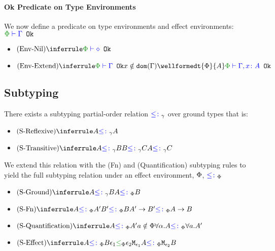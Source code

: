 \documentclass{report}
\begin{document}
\paragraph{Ok Predicate on Type Environments}
We now define a predicate on type environments and effect environments: $\oke{\P}{\G}$

\begin{itemize}
    \item $\ntreerulez{\envnil}{\oke{\P}{\nil}}$
    \item $\ntreeruleIII{\envextend}{\oke{\P}{\G}}{ x\notin\dom{\G}}{ \wellformedt{\P}{A}}{\oke{\P}{\gax}}$
\end{itemize}



\subsection{Subtyping}
    There exists a subtyping partial-order relation $\subtype_{\ground}$ over ground types that is:
    \begin{itemize}
        \item $\ntreerulez{\sreflexive}{A \subtype_{\ground} A}$
        \item $\ntreeruleII{\stransitive}{A \subtype_{\ground} B }{ B \subtype_{\ground} C}{A \subtype_{\ground} C}$
    \end{itemize}

    We extend this relation with the (Fn) and (Quantification) subtyping rules to yield the full subtyping relation under an effect environment, $\P$, $\subtypep$

    \begin{itemize}
        \item $\ntreeruleI{\sground}{A \subtype_{\ground} B}{A \subtypep B}$
        \item $\ntreeruleII{\sfun}{A \subtypep A' }{ B' \subtypep B }{\fntype{A'}{B'} \subtypep \ab}$
        \item $\ntreeruleII{\squant}{A\subtypep A'}{a\notin\P}{\all{\a}{A}\subtypep\all{a}{A'}}$
        \item $\ntreeruleII{\seffect}{A\subtypep B}{ \e_1\subeffectp\e_2}{\M{\e_1}{A}\subtypep\M{\e_2}{B}}$
    \end{itemize}
\end{document}
